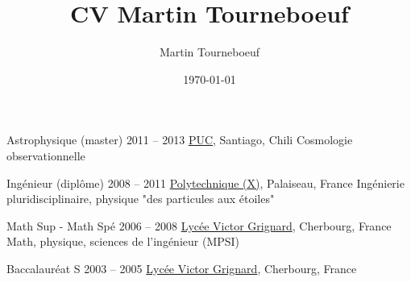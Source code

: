 \def\tbflanguage{french}

\ifx\HCode\undefined
  \providecommand{\tbfbordertop}{1.2}
  \providecommand\tbfborderleft{0.7}
  \providecommand\tbfwidth{12.4}
\else
  \providecommand{\tbfbordertop}{1}
  \providecommand\tbfborderleft{0.7}
  \providecommand\tbfwidth{12.4}
\fi

\ifx\HCode\undefined

%
\else

%
\fi

\title{CV Martin Tourneboeuf}
\author{Martin Tourneboeuf}
\date{\today}









\begin{coordinatelist}
\end{coordinatelist}



\pgfmathsetmacro{\tbfyeary}{\tbfbordertop+3.1}

\begin{yearlist}[7.7][\tbfborderleft][\tbfyeary]


\item[Astrophysique (master)]{2011 -- 2013}
  {
  \href{http://www.uc.cl/}{PUC}, Santiago, Chili
  }
  {    Cosmologie observationnelle}


\item[Ingénieur (diplôme)]{2008 -- 2011}
  {
  \tbfix
  \href{https://www.polytechnique.edu/}{Polytechnique (X)}, Palaiseau, France}
  {    Ingénierie pluridisciplinaire, physique "des particules aux étoiles"}


\item[Math Sup - Math Spé]{2006 -- 2008}
  {
  \href{http://www.lycee-grignard.fr/}{Lyc\'ee Victor Grignard}, Cherbourg, France
  }
  {    Math, physique, sciences de l'ingénieur (MPSI)}


\item[Baccalauréat S]{2003 -- 2005}
  {
  \href{http://www.lycee-grignard.fr/}{Lyc\'ee Victor Grignard}, Cherbourg, France
  }
  {\vspace{-0.5cm}}

\end{yearlist}



